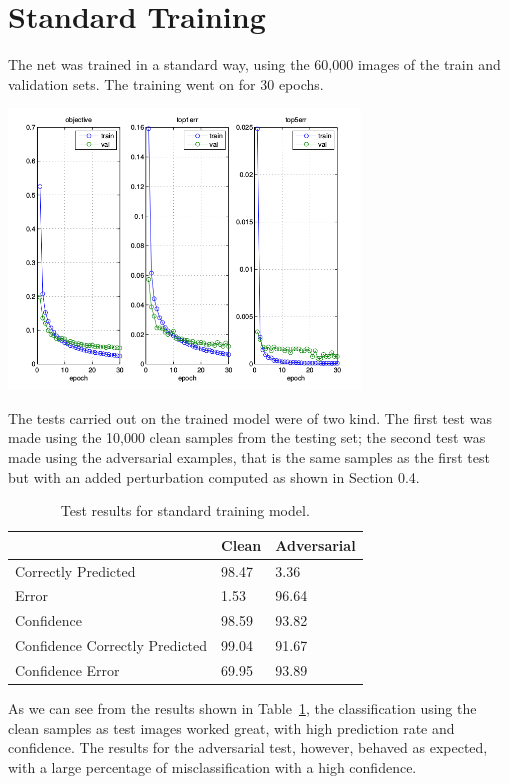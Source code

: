 \section{Standard Training}

The net was trained in a standard way, using the 60,000 images of the train and validation sets. The training went on for 30 epochs.

\begin{center}
  \includegraphics[width=0.7\textwidth]{img/train-base.png}
	\label{train-base} 
\end{center}

The tests carried out on the trained model were of two kind. The first test was made using the 10,000 clean samples from the testing set; the second test was made using the adversarial examples, that is the same samples as the first test but with an added perturbation computed as shown in Section 0.4.

\begin{table}[h]
\centering
\begin{tabular}{@{}lll@{}}
\toprule
                               & Clean & Adversarial \\ \midrule
Correctly Predicted            & 98.47 & 3.36        \\
Error                          & 1.53  & 96.64       \\
Confidence                     & 98.59 & 93.82       \\
Confidence Correctly Predicted & 99.04 & 91.67       \\
Confidence Error               & 69.95 & 93.89       \\ \bottomrule
\end{tabular}
\caption{Test results for standard training model.}
\label{standard-test}
\end{table}
\FloatBarrier


As we can see from the results shown in Table~\ref{standard-test}, the classification using the clean samples as test images worked great, with high prediction rate and confidence. The results for the adversarial test, however, behaved as expected, with a large percentage of misclassification with a high confidence.